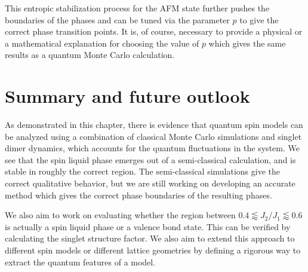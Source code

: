 \documentclass[../thesis_main.tex]{subfiles}
\begin{document}
\FloatBarrier \!\!\!\!\!\!\!\!\!\!\!
This entropic stabilization process for the AFM state further pushes the boundaries of the phases and can be tuned via the parameter $p$ to give the correct phase transition points. It is, of course, necessary to provide a physical or a mathematical explanation for choosing the value of $p$ which gives the same results as a quantum Monte Carlo calculation.

\section{Summary and future outlook}
As demonstrated in this chapter, there is evidence that quantum spin models can be analyzed using a combination of  classical Monte Carlo simulations and singlet dimer dynamics, which accounts for the quantum fluctuations in the system. We see that the spin liquid phase emerges out of a semi-classical calculation, and is stable in roughly the correct region. The semi-classical simulations give the correct qualitative behavior, but we are still working on developing an accurate method which gives the correct phase boundaries of the resulting phases.

We also aim to work on evaluating whether the region between $0.4 \lessapprox {J_2}/{J_1} \lessapprox 0.6$ is actually a spin liquid phase or a valence bond state. This can be verified by calculating the singlet structure factor. We also aim to extend this approach to different spin models or different lattice geometries by defining a rigorous way to extract the quantum features of a model.
\end{document}
